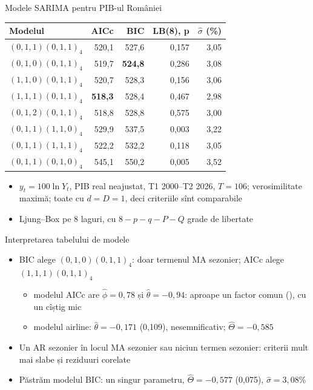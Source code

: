 \begin{frame}{Modele SARIMA pentru PIB-ul României}
\itemsize{\footnotesize}
\begin{center}
\scriptsize
\begin{tabular}{lrrrr}
\toprule
\textbf{Modelul} & \textbf{AICc} & \textbf{BIC} & \textbf{LB(8), p} & $\hat\sigma$ (\%) \\
\midrule
$(0,1,1)(0,1,1)_4$ & 520{,}1 & 527{,}6 & 0{,}157 & 3{,}05 \\
$(0,1,0)(0,1,1)_4$ & 519{,}7 & \textbf{524{,}8} & 0{,}286 & 3{,}08 \\
$(1,1,0)(0,1,1)_4$ & 520{,}7 & 528{,}3 & 0{,}156 & 3{,}06 \\
$(1,1,1)(0,1,1)_4$ & \textbf{518{,}3} & 528{,}4 & 0{,}467 & 2{,}98 \\
$(0,1,2)(0,1,1)_4$ & 518{,}8 & 528{,}8 & 0{,}575 & 3{,}00 \\
$(0,1,1)(1,1,0)_4$ & 529{,}9 & 537{,}5 & 0{,}003 & 3{,}22 \\
$(0,1,1)(1,1,1)_4$ & 522{,}2 & 532{,}2 & 0{,}118 & 3{,}05 \\
$(0,1,1)(0,1,0)_4$ & 545{,}1 & 550{,}2 & 0{,}005 & 3{,}52 \\
\bottomrule
\end{tabular}
\end{center}
\begin{itemize}
    \item $y_t = 100\ln Y_t$, PIB real neajustat, T1 2000--T2 2026, $T = 106$; verosimilitate maximă; toate cu $d = D = 1$, deci criteriile sînt comparabile
    \item Ljung--Box pe 8 laguri, cu $8 - p - q - P - Q$ grade de libertate
\end{itemize}
\end{frame}

\begin{frame}{Interpretarea tabelului de modele}
\itemsize{\small}
\begin{itemize}
    \item BIC alege $(0,1,0)(0,1,1)_4$: doar termenul MA sezonier; AICc alege $(1,1,1)(0,1,1)_4$
    \begin{itemize}
        \item modelul AICc are $\hat\phi = 0{,}78$ și $\hat\theta = \ensuremath{-}0{,}94$: aproape un factor comun (), cu un cîștig mic
        \item modelul airline: $\hat\theta = \ensuremath{-}0{,}171$ (0{,}109), nesemnificativ; $\hat\Theta = \ensuremath{-}0{,}585$
    \end{itemize}
    \item Un AR sezonier în locul MA sezonier sau niciun termen sezonier: criterii mult mai slabe și reziduuri corelate
    \item Păstrăm modelul BIC: un singur parametru, $\hat\Theta = \ensuremath{-}0{,}577$ (0{,}075), $\hat\sigma = 3{,}08\%$
\end{itemize}
\end{frame}


